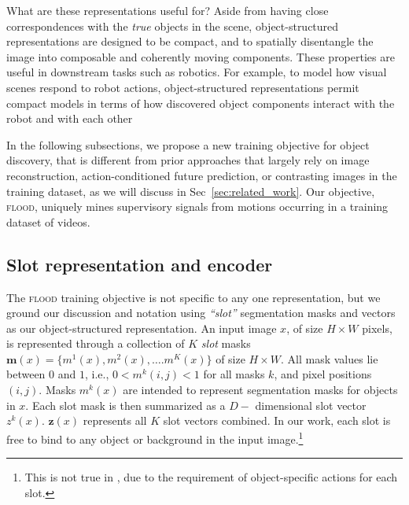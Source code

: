 \documentclass{article}
\begin{document}
What are these representations useful for? Aside from having close correspondences with the \emph{true} objects in the scene, object-structured representations are designed to be compact, and to spatially disentangle the image into composable and coherently moving components. These properties are useful in downstream tasks such as robotics. For example, to model how visual scenes respond to robot actions, object-structured representations permit compact models in terms of how discovered object components interact with the robot and with each other~\cite{minderer2019unsupervised, Kulkarni2019UnsupervisedLO, kipf2019contrastive, lambeta2020digit} %



 

In the following subsections, we propose a new training objective for object discovery, that is different from prior approaches that largely rely on image reconstruction, action-conditioned future prediction, or contrasting images in the training dataset, as we will discuss in Sec~\ref{sec:related_work}. Our objective, \textsc{flood}, uniquely mines supervisory signals from motions occurring in a training dataset of videos.  

\subsection{Slot representation and encoder} The \textsc{flood} training objective is not specific to any one representation, but we ground our discussion and notation using \emph{``slot''} segmentation masks and vectors as our object-structured representation. An input image $x$, of size $H \times W$ pixels, is represented through a collection of $K$ \emph{slot} masks $ \bm{m}(x) = \{m^1(x), m^2(x), \dots. m^K(x) \}$  of size $H\times W$. All mask values lie between $0$ and $1$, i.e., $0 < m^k(i, j) < 1$ for all masks $k$, and pixel positions $(i, j)$. Masks $m^k(x)$ are intended to represent segmentation masks for objects in $x$. Each slot mask is then summarized as a $D-$ dimensional slot vector $z^k(x)$. $\bm{z}(x)$ represents all $K$ slot vectors combined. In our work, each slot is free to bind to any object or background in the input image.\footnote{This is not true in \citet{kipf2019contrastive}, due to the requirement of object-specific actions for each slot.}
\end{document}

